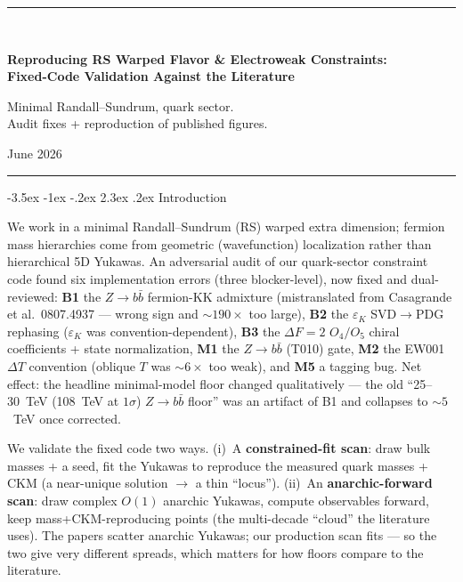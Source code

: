 \documentclass[11pt]{article}
\makeatletter
\renewcommand\section{\@startsection{section}{1}{\z@}%
  {-3.5ex \@plus -1ex \@minus -.2ex}%
  {2.3ex \@plus.2ex}%
  {\normalfont\Large\bfseries\color{accent}}}
\makeatother
\begin{document}
\begin{center}
{\color{accent}\rule{\textwidth}{1.5pt}}\\[1.2em]
{\LARGE\bfseries Reproducing RS Warped Flavor \& Electroweak Constraints:\\[0.3em]
Fixed-Code Validation Against the Literature\par}
\vspace{0.8em}
{\large Minimal Randall--Sundrum, quark sector.\\
Audit fixes + reproduction of published figures.\par}
\vspace{0.7em}
{\large June 2026\par}
\vspace{0.4em}
{\color{accent}\rule{\textwidth}{1.5pt}}
\end{center}
\vspace{1em}

\section{Introduction}

We work in a minimal Randall--Sundrum (RS) warped extra dimension; fermion mass
hierarchies come from geometric (wavefunction) localization rather than
hierarchical 5D Yukawas. An adversarial audit of our quark-sector constraint
code found six implementation errors (three blocker-level), now fixed and
dual-reviewed: \textbf{B1} the $Z\to b\bar b$ fermion-KK admixture (mistranslated
from Casagrande et al.\ 0807.4937 --- wrong sign and ${\sim}190\times$ too
large), \textbf{B2} the $\varepsilon_K$ SVD$\to$PDG rephasing ($\varepsilon_K$ was
convention-dependent), \textbf{B3} the $\Delta F=2$ $O_4/O_5$ chiral coefficients
+ state normalization, \textbf{M1} the $Z\to b\bar b$ (T010) gate, \textbf{M2} the
EW001 $\Delta T$ convention (oblique $T$ was ${\sim}6\times$ too weak), and
\textbf{M5} a tagging bug. Net effect: the headline minimal-model floor changed
qualitatively --- the old ``25--30~TeV (108~TeV at $1\sigma$) $Z\to b\bar b$
floor'' was an artifact of B1 and collapses to ${\sim}5$~TeV once corrected.

We validate the fixed code two ways. (i)~A \textbf{constrained-fit scan}: draw
bulk masses + a seed, fit the Yukawas to reproduce the measured quark masses +
CKM (a near-unique solution $\to$ a thin ``locus''). (ii)~An
\textbf{anarchic-forward scan}: draw complex $O(1)$ anarchic Yukawas, compute
observables forward, keep mass+CKM-reproducing points (the multi-decade
``cloud'' the literature uses). The papers scatter anarchic Yukawas; our
production scan fits --- so the two give very different spreads, which matters
for how floors compare to the literature.
\end{document}
